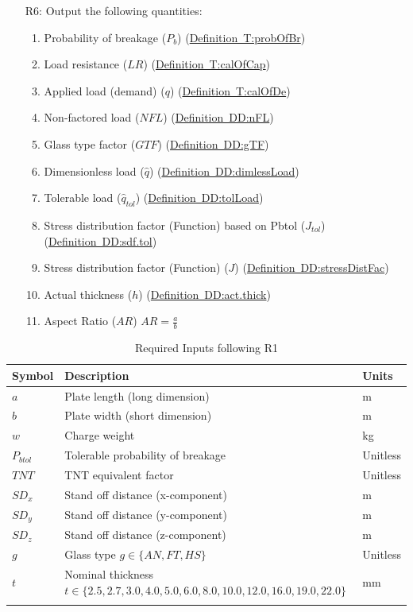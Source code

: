 \documentclass[12pt]{article}
\begin{document}
\begin{itemize}
\item[R6:]Output the following quantities:
          \begin{enumerate}
          \item{Probability of breakage (${P_{b}}$) (\hyperref[T:probOfBr]{Definition~T:probOfBr})}
          \item{Load resistance ($LR$) (\hyperref[T:calOfCap]{Definition~T:calOfCap})}
          \item{Applied load (demand) ($q$) (\hyperref[T:calOfDe]{Definition~T:calOfDe})}
          \item{Non-factored load ($NFL$) (\hyperref[DD:nFL]{Definition~DD:nFL})}
          \item{Glass type factor ($GTF$) (\hyperref[DD:gTF]{Definition~DD:gTF})}
          \item{Dimensionless load ($\hat{q}$) (\hyperref[DD:dimlessLoad]{Definition~DD:dimlessLoad})}
          \item{Tolerable load (${\hat{q}_{tol}}$) (\hyperref[DD:tolLoad]{Definition~DD:tolLoad})}
          \item{Stress distribution factor (Function) based on Pbtol (${J_{tol}}$) (\hyperref[DD:sdf.tol]{Definition~DD:sdf.tol})}
          \item{Stress distribution factor (Function) ($J$) (\hyperref[DD:stressDistFac]{Definition~DD:stressDistFac})}
          \item{Actual thickness ($h$) (\hyperref[DD:act.thick]{Definition~DD:act.thick})}
          \item{Aspect Ratio ($AR$) $AR=\frac{a}{b}$}
          \end{enumerate}
\end{itemize}
\begin{longtabu}{l X[l] l}
\toprule
Symbol & Description & Units
\\
\midrule
$a$ & Plate length (long dimension) & m
\\
$b$ & Plate width (short dimension) & m
\\
$w$ & Charge weight & kg
\\
${P_{btol}}$ & Tolerable probability of breakage & Unitless
\\
$TNT$ & TNT equivalent factor & Unitless
\\
${SD_{x}}$ & Stand off distance (x-component) & m
\\
${SD_{y}}$ & Stand off distance (y-component) & m
\\
${SD_{z}}$ & Stand off distance (z-component) & m
\\
$g$ & Glass type $g\in{}\{AN, FT, HS\}$ & Unitless
\\
$t$ & Nominal thickness $t\in{}\{2.5, 2.7, 3.0, 4.0, 5.0, 6.0, 8.0, 10.0, 12.0, 16.0, 19.0, 22.0\}$ & mm
\\
\bottomrule
\caption{Required Inputs following R1}
\label{Table:RequInpufollR1}
\end{longtabu}
\end{document}
